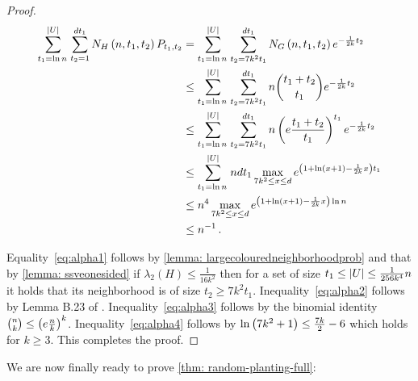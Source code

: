 \begin{proof}
    \begin{align}
    \sum_{t_1=\ln n\,}^{\Abs{U}}\sum_{t_2=1}^{d t_1}N_{H}\Paren{n,t_1,t_2}P_{t_1,t_2} & =\sum_{t_1=\ln n\,}^{\Abs{U}}\sum_{t_2= 7k^2t_1 }^{d t_1}N_{G}\Paren{n,t_1,t_2}e^{-\frac{1}{2k} t_2}\label{eq:alpha1}\\
    & \le\sum_{t_1=\ln n\,}^{\Abs{U}}\sum_{t_2= 7k^2t_1 }^{d t_1}n\binom{t_1+t_2 }{ t_1}e^{-\frac{1}{2k} t_2}\label{eq:alpha2}\\
    & \le\sum_{t_1=\ln n\,}^{\Abs{U}}\sum_{t_2= 7k^2t_1 }^{d t_1}n\Paren{e\frac{t_1+t_2}{t_1}}^{t_1}e^{-\frac{1}{2k} t_2}\label{eq:alpha3}\\
    & \le\sum_{t_1=\ln n\,}^{\Abs{U}}ndt_1\max_{7k^2\le x\le d}e^{\Paren{1+\ln(x+1)-\frac{1}{2k} x}t_1}\nonumber \\
    & \le n^{4}\max_{7k^2\le x\le d}e^{\Paren{1+\ln(x+1)-\frac{1}{2k} x}\ln{n}}\nonumber\\
    & \le n^{-1}\,.\label{eq:alpha4}
    \end{align}

    Equality~\ref{eq:alpha1} follows by \cref{lemma: largecolouredneighborhoodprob} and that by \cref{lemma: ssveonesided}
    if $\lambda_2(H)\le \frac{1}{16k^2}$ then for a set of size $t_1\le\left\lvert U\right\rvert\le\frac{1}{256k^4}n$ it holds that its neighborhood is of size $t_2\ge7k^2t_1$. Inequality~\ref{eq:alpha2} follows by Lemma B.23 of \cite{MR3536556-David16}. Inequality~\ref{eq:alpha3} follows by the binomial identity ${n \choose k}\le\left(e\frac{n}{k}\right)^{k}$. Inequality~\ref{eq:alpha4} follows by $\ln\left(7k^2+1\right)\leq \frac{7k}{2}-6$ which holds for $k\geq 3$. This completes the proof.
\end{proof}

We are now finally ready to prove \cref{thm: random-planting-full}:

